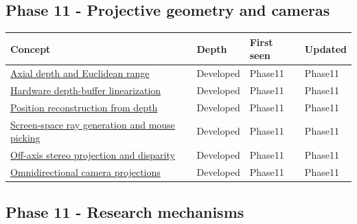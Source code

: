 \subsection{Phase 11 - Projective geometry and cameras}\label{appendix-a6d556a4ef50-phase-11---projective-geometry-and-cameras}

{\def\LTcaptype{none} %
\begin{longtable}[]{@{}
  >{\raggedright\arraybackslash}p{}
  >{\raggedright\arraybackslash}p{}
  >{\raggedright\arraybackslash}p{}
  >{\raggedright\arraybackslash}p{}@{}}
\toprule\noalign{}
\begin{minipage}[b]{\linewidth}\raggedright
Concept
\end{minipage} & \begin{minipage}[b]{\linewidth}\raggedright
Depth
\end{minipage} & \begin{minipage}[b]{\linewidth}\raggedright
First seen
\end{minipage} & \begin{minipage}[b]{\linewidth}\raggedright
Updated
\end{minipage} \\
\midrule\noalign{}
\endhead
\bottomrule\noalign{}
\endlastfoot
\hyperref[appendix-cac01ebeeb11]{Axial depth and Euclidean range} & Developed & Phase11 & Phase11 \\
\hyperref[appendix-1bc40b08db4a]{Hardware depth-buffer linearization} & Developed & Phase11 & Phase11 \\
\hyperref[appendix-2cbf2968e866]{Position reconstruction from depth} & Developed & Phase11 & Phase11 \\
\hyperref[appendix-f1a6d43e80d1]{Screen-space ray generation and mouse picking} & Developed & Phase11 & Phase11 \\
\hyperref[appendix-0976e86e5b9f]{Off-axis stereo projection and disparity} & Developed & Phase11 & Phase11 \\
\hyperref[appendix-fc99ad39f351]{Omnidirectional camera projections} & Developed & Phase11 & Phase11 \\
\end{longtable}
}

\subsection{Phase 11 - Research mechanisms}\label{appendix-a6d556a4ef50-phase-11---research-mechanisms}

